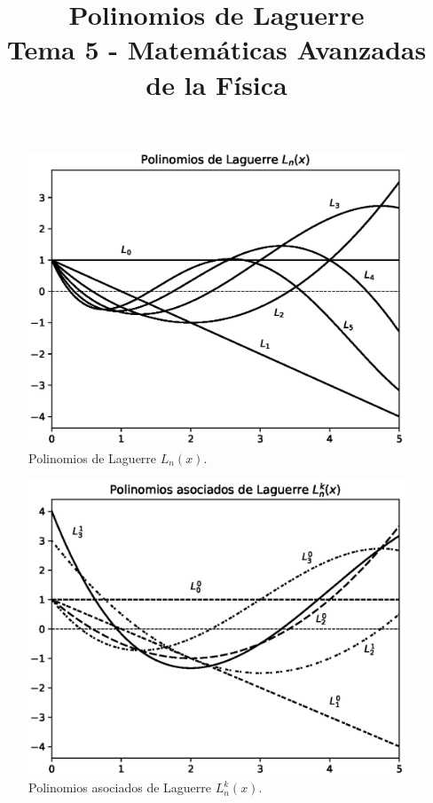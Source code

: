
\setlength{\jot}{12pt}
\title{Polinomios de Laguerre \\ {\large Tema 5 - Matemáticas Avanzadas de la Física}\vspace{-1.5\baselineskip}}
\author{}
\date{}

\maketitle
\fontsize{14}{14}\selectfont
\begin{figure}[H]
    \centering
    \includegraphics[scale=0.7]{Imagenes/plot_Laguerre_01.eps}
    \caption{Polinomios de Laguerre $L_{n}(x)$.}
\end{figure}
\begin{figure}[H]
    \centering
    \includegraphics[scale=0.7]{Imagenes/plot_Laguerre_02.eps}
    \caption{Polinomios asociados de Laguerre $L_{n}^{k}(x)$.}
\end{figure}
